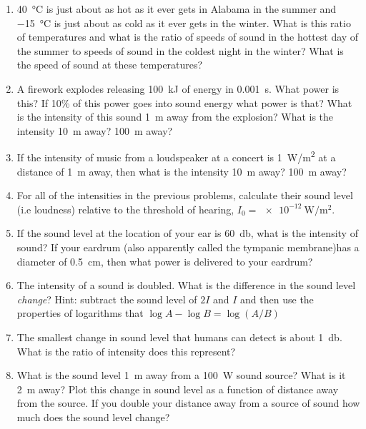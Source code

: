 \begin{enumerate}
	\item
	\SI{40}{\celsius} is just about as hot as it ever gets in Alabama in the summer and \SI{-15}{\celsius} is just about as cold as it ever gets in the winter. What is this ratio of temperatures and what is the ratio of speeds of sound in the hottest day of the summer to speeds of sound in the coldest night in the winter? What is the speed of sound at these temperatures?
	
	\item  
	A firework explodes releasing \SI{100}{\kilo\joule} of energy in \SI{0.001}{\second}. What power is this? If 10\% of this power goes into sound energy what power is that? What is the intensity of this sound \SI{1}{\meter} away from the explosion? What is the intensity \SI{10}{\meter} away? \SI{100}{\meter} away?
	
	\item
	If the intensity of music from a loudspeaker at a concert is \SI{1}{\watt/\meter^2} at a distance of \SI{1}{m} away, then what is the intensity \SI{10}{\meter} away? \SI{100}{\meter} away? 
	
	\item
	For all of the intensities in the previous problems, calculate their sound level (i.e loudness) relative to the threshold of hearing, $I_0=\SI{e-12}{\watt/\meter^2}$.
	
	\item
	If the sound level at the location of your ear is \SI{60}{\decibel}, what is the intensity of sound? If your eardrum (also apparently called the tympanic membrane)has a diameter of \SI{0.5}{cm}, then what power is delivered to your eardrum?
	
	\item
	The intensity of a sound is doubled. What is the difference in the sound level \emph{change}? {Hint: subtract the sound level of $2I$ and $I$ and then use the properties of logarithms that $\log A - \log B = \log\left(A/B\right)$}
	
	\item 
	The smallest change in sound level that humans can detect is about \SI{1}{\decibel}. What is the ratio of intensity does this represent?
	
	\item
	What is the sound level \SI{1}{\meter} away from a \SI{100}{\watt} sound source? What is it \SI{2}{\meter} away? Plot this change in sound level as a function of distance away from the source. If you double your distance away from a source of sound how much does the sound level change?
	

\end{enumerate}
